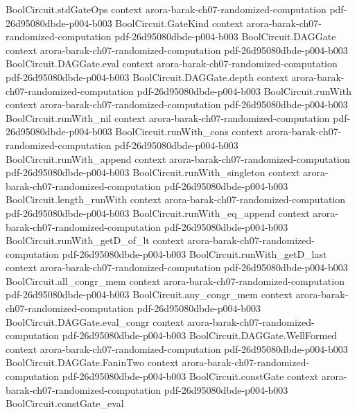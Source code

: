 \begin{theorem}
\proofstep
  {BoolCircuit.stdGateOps}
  {context}
  {arora-barak-ch07-randomized-computation}
  {pdf-26d95080dbde-p004-b003}
\proofstep
  {BoolCircuit.GateKind}
  {context}
  {arora-barak-ch07-randomized-computation}
  {pdf-26d95080dbde-p004-b003}
\proofstep
  {BoolCircuit.DAGGate}
  {context}
  {arora-barak-ch07-randomized-computation}
  {pdf-26d95080dbde-p004-b003}
\proofstep
  {BoolCircuit.DAGGate.eval}
  {context}
  {arora-barak-ch07-randomized-computation}
  {pdf-26d95080dbde-p004-b003}
\proofstep
  {BoolCircuit.DAGGate.depth}
  {context}
  {arora-barak-ch07-randomized-computation}
  {pdf-26d95080dbde-p004-b003}
\proofstep
  {BoolCircuit.runWith}
  {context}
  {arora-barak-ch07-randomized-computation}
  {pdf-26d95080dbde-p004-b003}
\proofstep
  {BoolCircuit.runWith_nil}
  {context}
  {arora-barak-ch07-randomized-computation}
  {pdf-26d95080dbde-p004-b003}
\proofstep
  {BoolCircuit.runWith_cons}
  {context}
  {arora-barak-ch07-randomized-computation}
  {pdf-26d95080dbde-p004-b003}
\proofstep
  {BoolCircuit.runWith_append}
  {context}
  {arora-barak-ch07-randomized-computation}
  {pdf-26d95080dbde-p004-b003}
\proofstep
  {BoolCircuit.runWith_singleton}
  {context}
  {arora-barak-ch07-randomized-computation}
  {pdf-26d95080dbde-p004-b003}
\proofstep
  {BoolCircuit.length_runWith}
  {context}
  {arora-barak-ch07-randomized-computation}
  {pdf-26d95080dbde-p004-b003}
\proofstep
  {BoolCircuit.runWith_eq_append}
  {context}
  {arora-barak-ch07-randomized-computation}
  {pdf-26d95080dbde-p004-b003}
\proofstep
  {BoolCircuit.runWith_getD_of_lt}
  {context}
  {arora-barak-ch07-randomized-computation}
  {pdf-26d95080dbde-p004-b003}
\proofstep
  {BoolCircuit.runWith_getD_last}
  {context}
  {arora-barak-ch07-randomized-computation}
  {pdf-26d95080dbde-p004-b003}
\proofstep
  {BoolCircuit.all_congr_mem}
  {context}
  {arora-barak-ch07-randomized-computation}
  {pdf-26d95080dbde-p004-b003}
\proofstep
  {BoolCircuit.any_congr_mem}
  {context}
  {arora-barak-ch07-randomized-computation}
  {pdf-26d95080dbde-p004-b003}
\proofstep
  {BoolCircuit.DAGGate.eval_congr}
  {context}
  {arora-barak-ch07-randomized-computation}
  {pdf-26d95080dbde-p004-b003}
\proofstep
  {BoolCircuit.DAGGate.WellFormed}
  {context}
  {arora-barak-ch07-randomized-computation}
  {pdf-26d95080dbde-p004-b003}
\proofstep
  {BoolCircuit.DAGGate.FaninTwo}
  {context}
  {arora-barak-ch07-randomized-computation}
  {pdf-26d95080dbde-p004-b003}
\proofstep
  {BoolCircuit.constGate}
  {context}
  {arora-barak-ch07-randomized-computation}
  {pdf-26d95080dbde-p004-b003}
\proofstep
  {BoolCircuit.constGate_eval}

\end{theorem}
